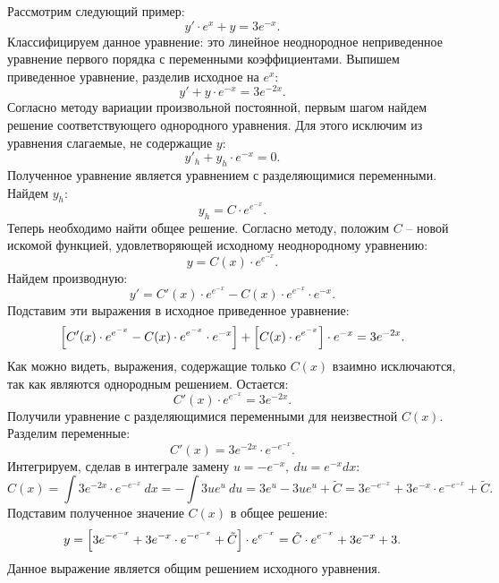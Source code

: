 		Рассмотрим следующий пример:
		\[ y' \cdot e^x + y = 3e^{-x}. \]
		Классифицируем данное уравнение: это линейное неоднородное неприведенное уравнение первого порядка с переменными коэффициентами. Выпишем приведенное уравнение, разделив исходное на $e^x$:
		\[ y' + y \cdot e^{-x} = 3e^{-2x}. \]
		Согласно методу вариации произвольной постоянной, первым шагом найдем решение соответствующего однородного уравнения. Для этого исключим из уравнения слагаемые, не содержащие $y$:
		\[ y'_h + y_h \cdot e^{-x} = 0. \]
		Полученное уравнение является уравнением с разделяющимися переменными. Найдем $y_h$:
		\[ y_h = C \cdot e^{e^{-x}}. \]
		Теперь необходимо найти общее решение. Согласно методу, положим $C$ -- новой искомой функцией, удовлетворяющей исходному неоднородному уравнению:
		\[ y = C(x) \cdot e^{e^{-x}}. \]
		Найдем производную:
		\[ y' = C'(x) \cdot e^{e^{-x}} - C(x) \cdot e^{e^{-x}} \cdot e^{-x}. \]
		Подставим эти выражения в исходное приведенное уравнение:
		\[ \left[ C'(x) \cdot e^{e^{-x}} - C(x) \cdot e^{e^{-x}} \cdot e^{-x} \right] + \left[ C(x) \cdot e^{e^{-x}} \right] \cdot e^{-x} = 3e^{-2x}. \]
		Как можно видеть, выражения, содержащие только $C(x)$ взаимно исключаются, так как являются однородным решением. Остается:
		\[ C'(x) \cdot e^{e^{-x}} = 3e^{-2x}. \]
		Получили уравнение с разделяющимися переменными для неизвестной $C(x)$. Разделим переменные:
		\[ C'(x) = 3e^{-2x} \cdot e^{-e^{-x}}. \]
		Интегрируем, сделав в интеграле замену $u = -e^{-x}, ~ du = e^{-x} dx$:
		\[ C(x) = \int 3e^{-2x} \cdot e^{-e^{-x}} ~ dx = -\int 3u e^u ~ du = 3e^u - 3u e^{u} + \tilde{C} = 3e^{-e^{-x}} + 3e^{-x} \cdot e^{-e^{-x}} + \tilde{C}. \]
		Подставим полученное значение $C(x)$ в общее решение:
		\[ y = \left[ 3e^{-e^{-x}} + 3e^{-x} \cdot e^{-e^{-x}} + \tilde{C} \right] \cdot e^{e^{-x}} = \tilde{C} \cdot e^{e^{-x}} + 3e^{-x} + 3. \]
		Данное выражение является общим решением исходного уравнения. 

	\pagebreak